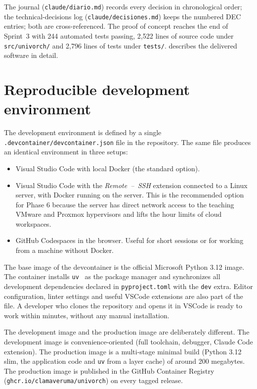 The journal (\texttt{claude/diario.md}) records every decision in
chronological order; the technical-decisions log
(\texttt{claude/decisiones.md}) keeps the numbered DEC entries; both
are cross-referenced. The proof of concept reaches the end of
Sprint~3 with 244 automated tests passing, 2{,}522 lines of source
code under \texttt{src/univorch/} and 2{,}796 lines of tests under
\texttt{tests/}.  describes the delivered
software in detail.

\section{Reproducible development environment}
\label{sec:entorno}

The development environment is defined by a single
\texttt{.devcontainer/devcontainer.json} file in the repository. The
same file produces an identical environment in three setups:

\begin{itemize}
  \item Visual Studio Code with local Docker (the standard option).
  \item Visual Studio Code with the \emph{Remote~--~SSH} extension
        connected to a Linux server, with Docker running on the
        server. This is the recommended option for Phase 6 because
        the server has direct network access to the teaching VMware
        and Proxmox hypervisors and lifts the hour limits of cloud
        workspaces.
  \item GitHub Codespaces in the browser. Useful for short sessions
        or for working from a machine without Docker.
\end{itemize}

The base image of the devcontainer is the official Microsoft Python
3.12 image. The container installs \texttt{uv}~\cite{uv-docs} as the
package manager and synchronizes all development dependencies
declared in \texttt{pyproject.toml} with the \texttt{dev} extra.
Editor configuration, linter settings and useful VSCode extensions
are also part of the file. A developer who clones the repository and
opens it in VSCode is ready to work within minutes, without any
manual installation.

The development image and the production image are deliberately
different. The development image is convenience-oriented (full
toolchain, debugger, Claude Code extension). The production image is
a multi-stage minimal build (Python 3.12 slim, the application code
and \texttt{uv} from a layer cache) of around 200 megabytes. The
production image is published in the GitHub Container Registry
(\texttt{ghcr.io/clamaveruma/univorch}) on every tagged release.

